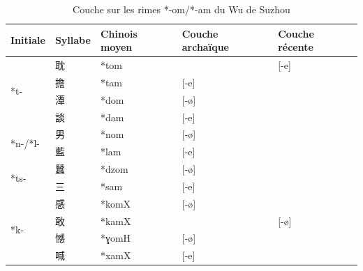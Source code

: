 \documentclass{scrbook}
\newcounter{c}[subsubsection]
\begin{document}
\begin{sloppypar}
\begin{table}[htbp]
  \centering
    \begin{tabular}{llllr}
    \toprule
    
    Initiale & Syllabe & Chinois moyen  & Couche archaïque & \multicolumn{1}{l}{Couche récente} \\
    \midrule
    \multirow{4}[2]{*}{*t-} & 耽     & *tom  &       & \multicolumn{1}{l}{[-e]} \\
          & \cellcolor[rgb]{ .851,  .851,  .851}擔 & \cellcolor[rgb]{ .851,  .851,  .851}*tam & \cellcolor[rgb]{ .851,  .851,  .851}[-e] & \cellcolor[rgb]{ .851,  .851,  .851} \\
          & 潭     & *dom  & [-ø]  &  \\
          & \cellcolor[rgb]{ .851,  .851,  .851}談 & \cellcolor[rgb]{ .851,  .851,  .851}*dam & \cellcolor[rgb]{ .851,  .851,  .851}[-e] & \cellcolor[rgb]{ .851,  .851,  .851} \\
    \midrule
    \multirow{2}[2]{*}{*n-/*l-} & 男     & *nom  & [-ø]  &  \\
          & \cellcolor[rgb]{ .851,  .851,  .851}藍 & \cellcolor[rgb]{ .851,  .851,  .851}*lam & \cellcolor[rgb]{ .851,  .851,  .851}[-e] & \cellcolor[rgb]{ .851,  .851,  .851} \\
    \midrule
    \multirow{2}[2]{*}{*ts-} & 蠶     & *dzom & [-ø]  &  \\
          & \cellcolor[rgb]{ .851,  .851,  .851}三 & \cellcolor[rgb]{ .851,  .851,  .851}*sam & \cellcolor[rgb]{ .851,  .851,  .851}[-e] & \cellcolor[rgb]{ .851,  .851,  .851} \\
    \midrule
    \multirow{4}[2]{*}{*k-} & 感     & *komX & [-ø]  &  \\
          & \cellcolor[rgb]{ .851,  .851,  .851}敢 & \cellcolor[rgb]{ .851,  .851,  .851}*kamX & \cellcolor[rgb]{ .851,  .851,  .851} & \multicolumn{1}{l}{\cellcolor[rgb]{ .851,  .851,  .851}[-ø]} \\
          & 憾     & *ɣomH & [-ø]  &  \\
          & \cellcolor[rgb]{ .851,  .851,  .851}喊 & \cellcolor[rgb]{ .851,  .851,  .851}*xamX & \cellcolor[rgb]{ .851,  .851,  .851}[-e] & \cellcolor[rgb]{ .851,  .851,  .851} \\
    \bottomrule
    \end{tabular}%
  \caption{Couche sur les rimes *-om/*-am du Wu de Suzhou}
  \label{tab:couche_om_am_suzhou}%
\end{table}%


\end{sloppypar}
\end{document}
